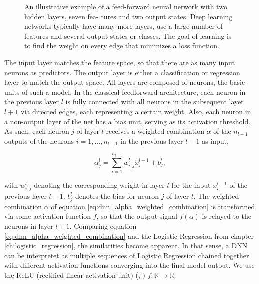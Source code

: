 \begin{figure}[H]
    \captionsetup{format=plain}
    \caption{ 
        An illustrative example of a feed-forward
        neural network with two hidden layers, seven fea-
        tures and two output states. Deep learning networks
        typically have many more layers, use a large number
        of features and several output states or classes. The
        goal of learning is to find the weight on every edge
        that minimizes a loss function.
        }
    \label{fig:deep_network_topology}
\end{figure}

The input layer matches the feature space, so that there are
as many input neurons as predictors. The output layer is either a classification or regression 
layer to match the output space. All layers are composed of neurons, the basic units of such
a model. In the classical feedforward architecture, each neuron in the previous layer $ l $  is fully
connected with all neurons in the subsequent layer $ l + 1 $ via directed edges, each representing
a certain weight. Also, each neuron in a non-output layer of the net has a bias unit, serving
as its activation threshold. As such, each neuron $j$ of layer $l$ receives a weighted combination $ \alpha $ of the
$ n_{l - 1} $ outputs of the neurons $i = 1, ..., n_{l - 1} $ in the previous layer $ l - 1 $ as input,

\begin{equation}
    \alpha_{j}^{l} = \sum_{ i=1 }^{ n_{l - 1} } w_{i, j}^{l} x_{i}^{l - 1} + b_{j}^{l},
    \label{eq:dnn_alpha_weighted_combination}
\end{equation}

with $ w_{i, j}^{l} $ denoting the corresponding weight in layer $l$ for the input $ x_{i}^{l - 1} $ of the previous layer $l - 1$.
$ b_{j}^{l} $ denotes the bias for neuron $j$ of layer $l$. 
The weighted combination $ \alpha $ of equation \ref{eq:dnn_alpha_weighted_combination} is transformed via
some activation function $ f $, so that the output signal $ f(\alpha) $ is relayed to the neurons
in layer $ l + 1 $. Comparing equation \ref{eq:dnn_alpha_weighted_combination} and the Logistic Regression from chapter \ref{ch:logistic_regression}, 
the similarities become apparent. In that sense, a DNN can be interpretet as multiple sequences of Logistic Regression
chained together with different activation functions converging into the final model output.
We use the ReLU (rectified linear activation unit) (\cite{arora2018relu}, \cite{berner2019reluDerivative})
$ f: \mathbb{R} \rightarrow \mathbb{R} $,

